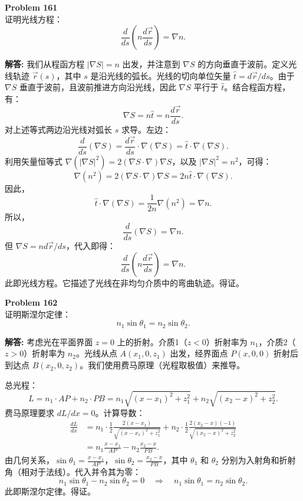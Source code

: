 \documentclass[12pt, a4paper, oneside]{ctexart}
\newenvironment{solution}{\par\noindent\textbf{解答:}\quad}{\par}
\begin{document}
\begin{mdframed}[backgroundcolor=gray!10, linewidth=0pt]
    \textbf{Problem 161} \\
    证明光线方程：
    \[
    \frac{d}{ds} \left( n \frac{d\vec{r}}{ds} \right) = \nabla n.
    \]
\end{mdframed}
\begin{solution}
    我们从程函方程 $|\nabla S| = n$ 出发，并注意到 $\nabla S$ 的方向垂直于波前。定义光线轨迹 $\vec{r}(s)$，其中 $s$ 是沿光线的弧长。光线的切向单位矢量 $\hat{t} = d\vec{r}/ds$。由于 $\nabla S$ 垂直于波前，且波前推进方向沿光线，因此 $\nabla S$ 平行于 $\hat{t}$。结合程函方程，有：
    \[
    \nabla S = n \hat{t} = n \frac{d\vec{r}}{ds}.
    \]
    对上述等式两边沿光线对弧长 $s$ 求导。左边：
    \[
    \frac{d}{ds} (\nabla S) = \frac{d\vec{r}}{ds} \cdot \nabla (\nabla S) = \hat{t} \cdot \nabla (\nabla S).
    \]
    利用矢量恒等式 $\nabla (|\nabla S|^2) = 2 (\nabla S \cdot \nabla) \nabla S$，以及 $|\nabla S|^2 = n^2$，可得：
    \[
    \nabla (n^2) = 2 (\nabla S \cdot \nabla) \nabla S = 2n \hat{t} \cdot \nabla (\nabla S).
    \]
    因此，
    \[
    \hat{t} \cdot \nabla (\nabla S) = \frac{1}{2n} \nabla (n^2) = \nabla n.
    \]
    所以，
    \[
    \frac{d}{ds} (\nabla S) = \nabla n.
    \]
    但 $\nabla S = n d\vec{r}/ds$，代入即得：
    \[
    \frac{d}{ds} \left( n \frac{d\vec{r}}{ds} \right) = \nabla n.
    \]
    此即光线方程。它描述了光线在非均匀介质中的弯曲轨迹。得证。
\end{solution}

\begin{mdframed}[backgroundcolor=gray!10, linewidth=0pt]
    \textbf{Problem 162} \\
    证明斯涅尔定律：
    \[
    n_1 \sin\theta_1 = n_2 \sin\theta_2.
    \]
\end{mdframed}
\begin{solution}
    考虑光在平面界面 $z=0$ 上的折射。介质1（$z<0$）折射率为 $n_1$，介质2（$z>0$）折射率为 $n_2$。光线从点 $A(x_1,0,z_1)$ 出发，经界面点 $P(x,0,0)$ 折射后到达点 $B(x_2,0,z_2)$。我们使用费马原理（光程取极值）来推导。

    总光程：
    \[
    L = n_1 \cdot AP + n_2 \cdot PB = n_1 \sqrt{(x - x_1)^2 + z_1^2} + n_2 \sqrt{(x_2 - x)^2 + z_2^2}.
    \]
    费马原理要求 $dL/dx = 0$。计算导数：
    \begin{align*}
        \frac{dL}{dx} &= n_1 \cdot \frac{1}{2} \frac{2(x - x_1)}{\sqrt{(x - x_1)^2 + z_1^2}} + n_2 \cdot \frac{1}{2} \frac{2(x_2 - x)(-1)}{\sqrt{(x_2 - x)^2 + z_2^2}} \\
        &= n_1 \frac{x - x_1}{AP} - n_2 \frac{x_2 - x}{PB}.
    \end{align*}
    由几何关系，$\sin\theta_1 = \frac{x - x_1}{AP}$，$\sin\theta_2 = \frac{x_2 - x}{PB}$，其中 $\theta_1$ 和 $\theta_2$ 分别为入射角和折射角（相对于法线）。代入并令其为零：
    \[
    n_1 \sin\theta_1 - n_2 \sin\theta_2 = 0 \quad \Rightarrow \quad n_1 \sin\theta_1 = n_2 \sin\theta_2.
    \]
    此即斯涅尔定律。得证。
\end{solution}
\end{document}

